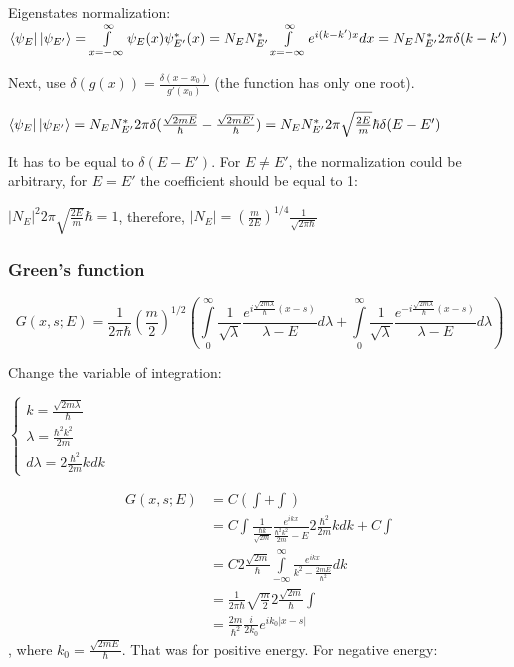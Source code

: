 \documentclass[12pt, a4paper]{article}
\begin{document}
Eigenstates normalization: $\bra{\psi_E} \ket{\psi_{E'}} = \int\limits_{x = - \infty}^\infty \psi_E(x) \psi_{E'}^*(x) = N_E N_{E'}^* \int\limits_{x = - \infty}^\infty e^{i (k - k') x} dx = \\ N_E N^*_{E'} 2 \pi \delta(k - k')$

Next, use $\delta(g(x)) = \frac{\delta(x - x_0)}{g'(x_0)}$ (the function has only one root).

$\bra{\psi_E} \ket{\psi_{E'}} = N_E N^*_{E'} 2 \pi \delta(\frac{\sqrt{2 m E}}{\hbar} - \frac{\sqrt{2 m E'}}{\hbar}) = N_E N^*_{E'} 2 \pi \sqrt{\frac{2 E }{m}} \hbar \delta(E - E')$

It has to be equal to $\delta(E - E')$. For $E \ne E'$, the normalization could be arbitrary, for $E = E'$ the coefficient should be equal to 1:

$|N_E|^2 2 \pi \sqrt{\frac{2 E}{m}} \hbar = 1$, therefore, $|N_E| = \left( \frac{m}{2E}\right)^{1/4}  \frac{1}{\sqrt{2 \pi \hbar}}$

\subsubsection{Green's function}
$$G(x, s; E) = \frac{1}{2 \pi \hbar} \left( \frac{m}{2}\right)^{1/2}  \left( \int\limits_{0}^{\infty} \frac{1}{\sqrt{\lambda}}\frac{e^{i \frac{\sqrt{2 m \lambda}}{\hbar} (x - s)}}{\lambda - E} d \lambda + \int\limits_{0}^{\infty} \frac{1}{\sqrt{\lambda}}\frac{e^{-i \frac{\sqrt{2 m \lambda}}{\hbar} (x - s)}}{\lambda - E} d \lambda \right)$$

Change the variable of integration: 

$\begin{cases}
k = \frac{\sqrt{2 m \lambda}}{\hbar} \\
\lambda = \frac{\hbar^2 k^2}{2m}\\
d \lambda = 2\frac{\hbar^2}{2 m} k dk
\end{cases}$


\begin{align*}
G(x, s; E) &= C (\int + \int) \\
&= C \int \frac{1}{\frac{\hbar k}{\sqrt{2 m}}} \frac{e^{ikx}}{\frac{\hbar^2 k^2}{2m} - E} 2 \frac{\hbar^2}{2 m} k dk + C \int \\
&= C 2 \frac{\sqrt{2m}}{\hbar} \int\limits_{-\infty}^\infty \frac{e^{ikx}}{k^2 - \frac{2mE}{\hbar^2}} dk \\
&= \frac{1}{2 \pi \hbar} \sqrt{\frac{m}{2}} 2 \frac{\sqrt{2 m}}{\hbar} \int  \\
&= \frac{2m}{\hbar^2} \frac{i}{2 k_0} e^{i k_0 |x - s|}
\end{align*}
, where $k_0 = \frac{\sqrt{2 m E}}{\hbar}$. That was for positive energy. For negative energy:
\end{document}
